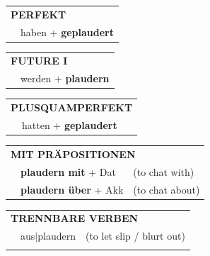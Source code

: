 \documentclass[10pt,a4paper]{revtex4-2}
\begin{document}
\begin{verbbox}
\vspace{10pt}

\begin{tabular}{rl}
\multicolumn{2}{l}{\textbf{PERFEKT}}\\
& haben + \textbf{geplaudert}\\
\end{tabular}
\hfill
\begin{tabular}{rl}
\multicolumn{2}{l}{\textbf{FUTURE I}}\\
& werden + \textbf{plaudern}\\
\end{tabular}
\hfill
\begin{tabular}{rl}
\multicolumn{2}{l}{\textbf{PLUSQUAMPERFEKT}}\\
& hatten + \textbf{geplaudert}\\
\end{tabular}

\vspace{10pt}

\begin{tabular}{lll}
\multicolumn{3}{l}{\textbf{MIT PRÄPOSITIONEN}}\\
& \textbf{plaudern mit} + Dat & (to chat with)\\
& \textbf{plaudern über} + Akk & (to chat about)\\
\end{tabular}
\hfill
\begin{tabular}{lll}
\multicolumn{3}{l}{\textbf{TRENNBARE VERBEN}}\\
& aus$|$plaudern & (to let slip / blurt out)\\
\vspace{10pt}
\end{tabular}

\vspace{-5pt}
\end{verbbox}
\end{document}
